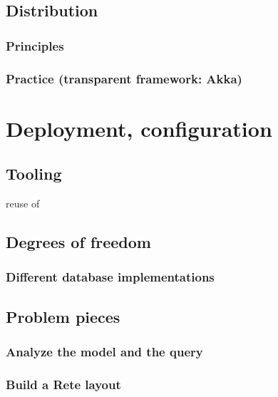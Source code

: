 

\subsection{Distribution}

\subsubsection{Principles}

\subsubsection{Practice (transparent framework: Akka)}

\section{Deployment, configuration}

\subsection{Tooling}

 reuse of \eiq


\subsection{Degrees of freedom}

\subsubsection{Different database implementations}

\subsection{Problem pieces}

\subsubsection{Analyze the model and the query}

\subsubsection{Build a Rete layout}

